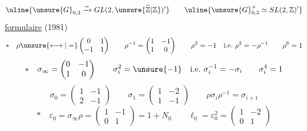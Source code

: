 \[
\uline{\unsure{G}_{0,3}\xrightarrow{\sim}GL(2,\unsure{\widehat{\mathbb Z}|\mathbb Z})'}
\qquad\uline{\unsure{G}_{0,3}^{+}\simeq SL(2,\mathbb Z)'}
\]
\uline{formulaire} (1981)
\[
*\quad\rho\unsure{\longleftrightarrow|=}\begin{pmatrix}0&1\\-1&1\end{pmatrix}\qquad
\rho^{-1}=\begin{pmatrix}1&-1\\1&0\end{pmatrix}\qquad
\rho^3=-1\quad\text{i.e.}\ \rho^2=-\rho^{-1}\qquad\rho^6=1
\]
\[
*\quad\sigma_\infty=\begin{pmatrix}0&-1\\1&0\end{pmatrix}\qquad
\sigma_i^2=\unsure{-1}\quad\text{i.e.}\ \sigma_i^{-1}=-\sigma_i\qquad\sigma_i^4=1
\]
\[
\sigma_0=\begin{pmatrix}1&-1\\2&-1\end{pmatrix}\qquad
\sigma_1=\begin{pmatrix}1&-2\\1&-1\end{pmatrix}\qquad
\rho\sigma_i\rho^{-1}=\sigma_{i+1}
\]
\[
*\quad\varepsilon_0=\sigma_\infty\rho=\begin{pmatrix}1&-1\\0&1\end{pmatrix}=1+N_0\qquad
\ell_0=\varepsilon_0^2=\begin{pmatrix}1&-2\\0&1\end{pmatrix}
\]
